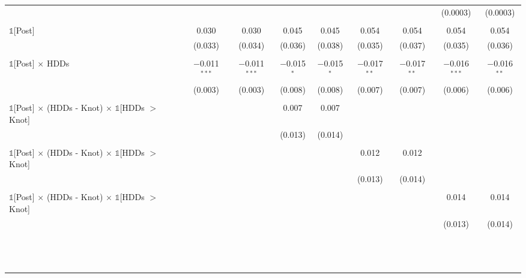 \begin{table}[!htbp]
\begin{longtable}{@{\extracolsep{0pt}}lcccccccc}
  &  &  &  &  &  &  & (0.0003) & (0.0003) \\ 
  & & & & & & & & \\ 
 $\mathbb{1}$[Post] & 0.030 & 0.030 & 0.045 & 0.045 & 0.054 & 0.054 & 0.054 & 0.054 \\ 
  & (0.033) & (0.034) & (0.036) & (0.038) & (0.035) & (0.037) & (0.035) & (0.036) \\ 
  & & & & & & & & \\ 
 $\mathbb{1}$[Post] $\times$ HDDs & $-$0.011$^{***}$ & $-$0.011$^{***}$ & $-$0.015$^{*}$ & $-$0.015$^{*}$ & $-$0.017$^{**}$ & $-$0.017$^{**}$ & $-$0.016$^{***}$ & $-$0.016$^{**}$ \\ 
  & (0.003) & (0.003) & (0.008) & (0.008) & (0.007) & (0.007) & (0.006) & (0.006) \\ 
  & & & & & & & & \\ 
 $\mathbb{1}$[Post] $\times$ (HDDs - Knot) $\times$ $\mathbb{1}$[HDDs $>$ Knot] &  &  & 0.007 & 0.007 &  &  &  &  \\ 
  &  &  & (0.013) & (0.014) &  &  &  &  \\ 
  & & & & & & & & \\ 
 $\mathbb{1}$[Post] $\times$ (HDDs - Knot) $\times$ $\mathbb{1}$[HDDs $>$ Knot] &  &  &  &  & 0.012 & 0.012 &  &  \\ 
  &  &  &  &  & (0.013) & (0.014) &  &  \\ 
  & & & & & & & & \\ 
 $\mathbb{1}$[Post] $\times$ (HDDs - Knot) $\times$ $\mathbb{1}$[HDDs $>$ Knot] &  &  &  &  &  &  & 0.014 & 0.014 \\ 
  &  &  &  &  &  &  & (0.013) & (0.014) \\ 
  & & & & & & & & \\
    & & & & & & & & \\
      & & & & & & & & \\
        & & & & & & & & \\
          & & & & & & & & \\
            & & & & & & & & \\
              & & & & & & & & \\
                & & & & & & & & \\
                  & & & & & & & & \\
                    & & & & & & & & \\ 
                      & & & & & & & & \\
    & & & & & & & & \\
      & & & & & & & & \\

\end{longtable}
\end{table}
